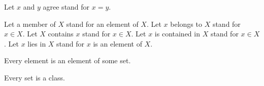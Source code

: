 \begin{forthel}

  Let $x$ and $y$ agree stand for $x = y$.

  Let a member of $X$ stand for an element of $X$.
  Let $x$ belongs to $X$ stand for $x \in X$.
  Let $X$ contains $x$ stand for $x \in X$.
  Let $x$ is contained in $X$ stand for $x \in X$.
  Let $x$ lies in $X$ stand for $x$ is an element of $X$.

  \begin{axiom}
    Every element is an element of some set.
  \end{axiom}

  \begin{axiom}
    Every set is a class.
  \end{axiom}
\end{forthel}
